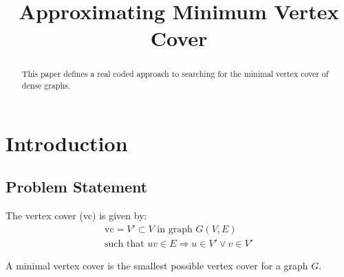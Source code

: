 \documentclass[conference,letterpaper]{IEEEtran}
\begin{document}
\title{Approximating Minimum Vertex Cover}
\author{
}

\maketitle

\begin{abstract}
    This paper defines a real coded approach to searching for the minimal vertex cover of dense graphs. %
\end{abstract}

%
%   
\section{Introduction}
\subsection{Problem Statement}
\par The vertex cover (vc) is given by:
\begin{equation}
    \begin{split}
        \mbox{vc} = V\prime \subset V \mbox{ in graph } G(V,E) \\
        \mbox{such that } uv \in E \Rightarrow u \in V\prime \lor v \in V\prime
    \end{split}
\end{equation}
\par A minimal vertex cover is the smallest possible vertex cover for a graph $G$.
\end{document}
